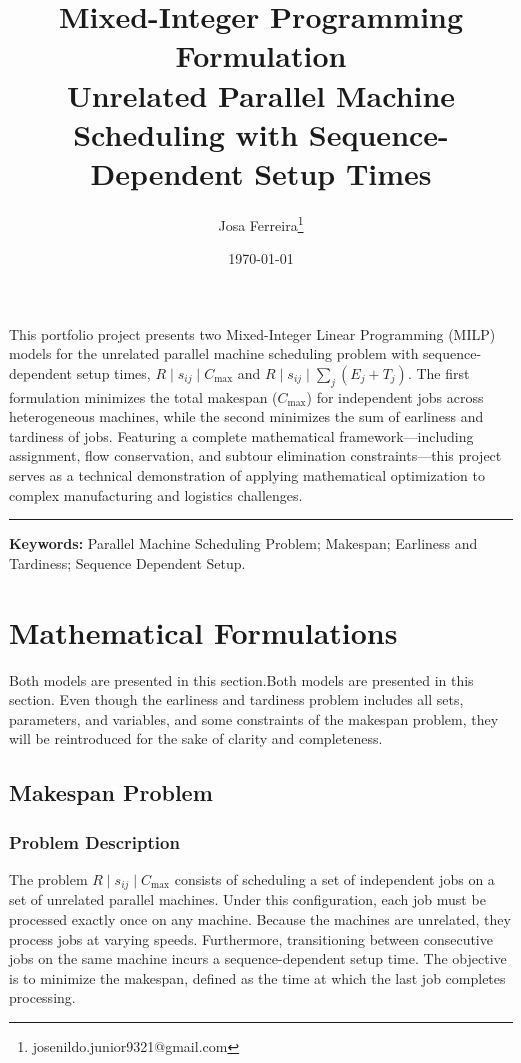\documentclass{article}
\title{
    \textbf{Mixed-Integer Programming Formulation}\\[0.4em]
    \large{Unrelated Parallel Machine Scheduling with Sequence-Dependent Setup Times}\\[0.4em]
}
\date{\today}
\author{Josa Ferreira\footnote{josenildo.junior9321@gmail.com}}
\renewenvironment{abstract}
 {\begin{flushleft}
  \bfseries \abstractname\vspace{-.5em}\vspace{0pt}
  \end{flushleft}
  \list{}{
    \setlength{\leftmargin}{0pt}%
    \setlength{\rightmargin}{\leftmargin}%
  }%
  \item\relax}
 {\endlist}
\begin{document}
\maketitle

\begin{abstract}
This portfolio project presents two Mixed-Integer Linear Programming (MILP) models for the unrelated parallel machine scheduling problem with sequence-dependent setup times, $R \mid s_{ij} \mid C_{\max}$ and $R \mid s_{ij} \mid \sum_j(E_j + T_j)$. The first formulation minimizes the total makespan ($C_{\max}$) for independent jobs across heterogeneous machines, while the second minimizes the sum of earliness and tardiness of jobs.
Featuring a complete mathematical framework—including assignment, flow conservation, and subtour elimination constraints—this project serves as a technical demonstration of applying mathematical optimization to complex manufacturing and logistics challenges.
\end{abstract}

\tableofcontents

\vspace{0.5cm}

\noindent \rule[0.4cm]{5cm}{0.1pt}

\noindent \textbf{Keywords:} Parallel Machine Scheduling Problem; Makespan; Earliness and Tardiness; Sequence Dependent Setup.

\section{Mathematical Formulations}

Both models are presented in this section.Both models are presented in this section. Even though the earliness and tardiness problem includes all sets, parameters, and variables, and some constraints of the makespan problem, they will be reintroduced for the sake of clarity and completeness.

\subsection{Makespan Problem}

\subsubsection{Problem Description}

The problem $R \mid s_{ij} \mid C_{\max}$ consists of scheduling a set of independent jobs on a set of unrelated parallel machines. 
Under this configuration, each job must be processed exactly once on any machine. 
Because the machines are unrelated, they process jobs at varying speeds. 
Furthermore, transitioning between consecutive jobs on the same machine incurs a sequence-dependent setup time. 
The objective is to minimize the makespan, defined as the time at which the last job completes processing.
\end{document}
